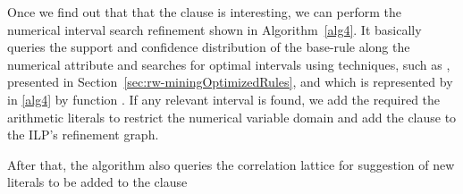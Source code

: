 Once we find out that that the clause is interesting, we can perform the numerical interval search refinement
shown in Algorithm~\ref{alg4}. It basically queries the support and confidence distribution of the base-rule along the
numerical attribute and searches for optimal intervals using techniques, such as \cite{Brin99miningoptimized}, presented
in Section~\ref{sec:rw-miningOptimizedRules}, and which is represented by in \ref{alg4} by function
. If any relevant interval is found, we add the required the arithmetic literals to
restrict the numerical variable domain and add the clause to the ILP's refinement graph.

After that, the algorithm also queries the correlation lattice for suggestion of new literals to be added to the clause

